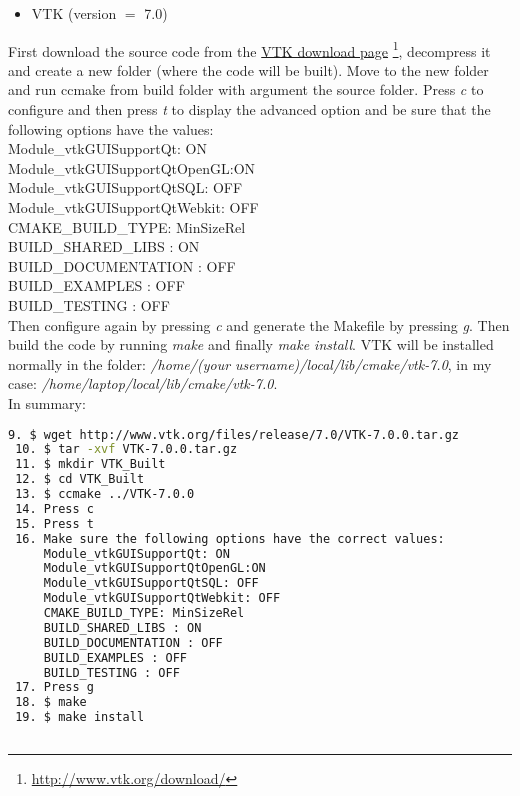 \documentclass[12pt]{article}
\begin{document}
\begin{itemize}
\item VTK (version $=$ 7.0)
\end{itemize}
\begin{par}
First download the source code from the 
\href{http://www.vtk.org/download/ }{\color{blue} VTK download page}
\footnote{\url{http://www.vtk.org/download/}}, decompress it and create a new folder (where
the code will be built). Move to the new folder and run ccmake from build folder with argument the
source folder. Press \textit{c} to configure and then press \textit{t} to display the advanced
option and be sure that the following options have the values:\\

\noindent
Module\_vtkGUISupportQt: ON\\
Module\_vtkGUISupportQtOpenGL:ON\\
Module\_vtkGUISupportQtSQL: OFF\\
Module\_vtkGUISupportQtWebkit: OFF\\
CMAKE\_BUILD\_TYPE: MinSizeRel\\
BUILD\_SHARED\_LIBS : ON\\
BUILD\_DOCUMENTATION : OFF\\
BUILD\_EXAMPLES : OFF\\
BUILD\_TESTING : OFF\\

Then configure again by pressing \textit{c} and generate the Makefile by pressing \textit{g}.
Then build the code by running \textit{make}  and finally \textit{make install}. VTK will be installed normally in the folder: \textit{/home/(your username)/local/lib/cmake/vtk-7.0}, in my case: \textit{/home/laptop/local/lib/cmake/vtk-7.0}.\\

In summary:\\

\noindent
\small
\begin{lstlisting}[language=bash]
  9. $ wget http://www.vtk.org/files/release/7.0/VTK-7.0.0.tar.gz
 10. $ tar -xvf VTK-7.0.0.tar.gz
 11. $ mkdir VTK_Built
 12. $ cd VTK_Built
 13. $ ccmake ../VTK-7.0.0
 14. Press c 
 15. Press t
 16. Make sure the following options have the correct values:
     Module_vtkGUISupportQt: ON
     Module_vtkGUISupportQtOpenGL:ON
     Module_vtkGUISupportQtSQL: OFF
     Module_vtkGUISupportQtWebkit: OFF
     CMAKE_BUILD_TYPE: MinSizeRel
     BUILD_SHARED_LIBS : ON
     BUILD_DOCUMENTATION : OFF
     BUILD_EXAMPLES : OFF
     BUILD_TESTING : OFF
 17. Press g
 18. $ make
 19. $ make install
  
\end{lstlisting}
\end{par}
\normalsize
\end{document}
